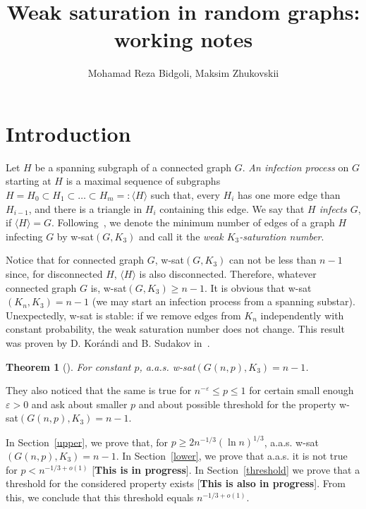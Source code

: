 \documentclass[]{article}
\title{Weak saturation in random graphs: working notes}
\author{Mohamad Reza Bidgoli, Maksim Zhukovskii}
\newtheorem{theorem}{Theorem}%
\begin{document}
\maketitle


\section{Introduction}
Let $H$ be a spanning subgraph of a connected graph $G$. {\it An infection process} on $G$ starting at $H$ is a maximal sequence of subgraphs $H = H_0 \subset H_1 \subset \ldots \subset H_m =: \langle H \rangle$ such that, every
$H_i$ has one more edge than $H_{i-1}$, and there is a triangle in $H_i$ containing this edge. We say that {\it $H$ infects $G$}, if $\langle H \rangle =G$. Following~\cite{Sudakov}, we denote the minimum number of edges of a graph $H$ infecting $G$ by w-sat$(G,K_3)$ and call it the {\it weak $K_3$-saturation number}. 

Notice that for connected graph $G$, w-sat$(G,K_3)$ can not be less than $n-1$ since, for disconnected $H$, $\langle H\rangle$ is also disconnected. Therefore, whatever connected graph $G$ is, w-sat$(G,K_3)\geq n-1$. It is obvious that w-sat$(K_n,K_3)=n-1$ (we may start an infection process from a spanning substar). Unexpectedly, w-sat is stable: if we remove edges from $K_n$ independently with constant probability, the weak saturation number does not change. This result was proven by D. Kor\'{a}ndi and B. Sudakov in~\cite{Sudakov}.

\begin{theorem}[\cite{Sudakov}]
For constant $p$, a.a.s. w-sat$(G(n,p),K_3)=n-1$.
\end{theorem}

They also noticed that the same is true for $n^{-\varepsilon}\leq p\leq 1$ for certain small enough $\varepsilon>0$ and ask about smaller $p$ and about possible threshold for the property w-sat$(G(n,p),K_3)=n-1$.

In Section~\ref{upper}, we prove that, for $p \geq 2n^{-1/3} (\ln n)^{1/3}$, a.a.s. w-sat$(G(n,p),K_3)=n-1$. In Section~\ref{lower}, we prove that a.a.s. it is not true for $p<n^{-1/3+o(1)}$ [{\bf This is in progress}]. In Section~\ref{threshold} we prove that a threshold for the considered property exists [{\bf This is also in progress}]. From this, we conclude that this threshold equals $n^{-1/3+o(1)}$.
\end{document}
